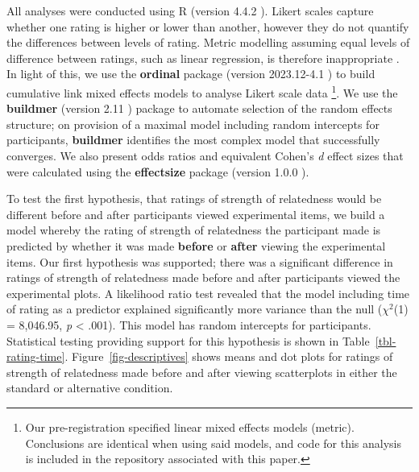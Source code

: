 \documentclass[sigconf]{acmart}
\begin{document}
All analyses were conducted using R (version 4.4.2 \citep{rcore}).
Likert scales capture whether one rating is higher or lower than
another, however they do not quantify the differences between levels of
rating. Metric modelling assuming equal levels of difference between
ratings, such as linear regression, is therefore inappropriate
\citep{liddell_2018}. In light of this, we use the \textbf{ordinal}
package (version 2023.12-4.1 \citep{ordinal}) to build cumulative link
mixed effects models to analyse Likert scale data \footnote{Our
  pre-registration specified linear mixed effects models (metric).
  Conclusions are identical when using said models, and code for this
  analysis is included in the repository associated with this paper.}.
We use the \textbf{buildmer} (version 2.11 \citep{buildmer}) package to
automate selection of the random effects structure; on provision of a
maximal model including random intercepts for participants,
\textbf{buildmer} identifies the most complex model that successfully
converges. We also present odds ratios and equivalent Cohen's \emph{d}
effect sizes that were calculated using the \textbf{effectsize} package
(version 1.0.0 \citep{effectsize}).

To test the first hypothesis, that ratings of strength of relatedness
would be different before and after participants viewed experimental
items, we build a model whereby the rating of strength of relatedness
the participant made is predicted by whether it was made \textbf{before}
or \textbf{after} viewing the experimental items. Our first hypothesis
was supported; there was a significant difference in ratings of strength
of relatedness made before and after participants viewed the
experimental plots. A likelihood ratio test revealed that the model
including time of rating as a predictor explained significantly more
variance than the null (\(\chi^2\)(1) = 8,046.95, \emph{p} \textless{}
.001). This model has random intercepts for participants. Statistical
testing providing support for this hypothesis is shown in
Table~\ref{tbl-rating-time}. Figure~\ref{fig-descriptives} shows means
and dot plots for ratings of strength of relatedness made before and
after viewing scatterplots in either the standard or alternative
condition.

\begin{table}

\caption{\label{tbl-rating-time}Statistics for the significant main
effect of rating time. Odds ratio and the equivalent Cohen's \textit{d}
value is also supplied.}


\end{table}%
\end{document}
